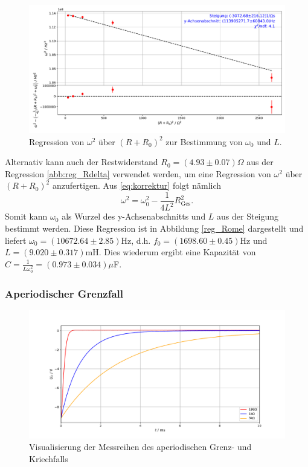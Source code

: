 \documentclass[a4paper, 12pt]{scrartcl}
\begin{document}
\begin{figure}[h]
\centering
\includegraphics[width=\textwidth]{plots/reg_Rome.pdf}
\caption{Regression von $\omega^2$ über $(R+R_0)^2$ zur Bestimmung von $\omega_0$ und $L$.}
\label{abb:reg_Rome}
\end{figure}

Alternativ kann auch der Restwiderstand $R_0 = (4.93\pm 0.07)\Omega$ aus der Regression \ref{abb:reg_Rdelta} verwendet werden, um eine Regression von $\omega^2$ über $(R+R_0)^2$ anzufertigen. Aus \ref{eq:korrektur} folgt nämlich
$$\omega^2 = \omega_0^2 - \frac{1}{4L^2} R_{\text{Ges}}^2\text{.}$$
Somit kann $\omega_0$ als Wurzel des y-Achsenabschnitts und $L$ aus der Steigung bestimmt werden. Diese Regression ist in Abbildung \ref{reg_Rome} dargestellt und liefert $\omega_0 = (10672.64\pm 2.85)$Hz, d.h. $f_0 = (1698.60\pm0.45)$Hz und $L = (9.020\pm0.317)$mH. Dies wiederum ergibt eine Kapazität von $C = \frac{1}{L\omega_0^2} = (0.973\pm 0.034)\mu$F.



\subsubsection{Aperiodischer Grenzfall}

\begin{figure}[H]
\centering
\includegraphics[width=\textwidth]{plots/rohdaten_kriech.pdf}
\caption{Visualisierung der Messreihen des aperiodischen Grenz- und Kriechfalls}
\label{abb:rohkriech}
\end{figure}
\end{document}
